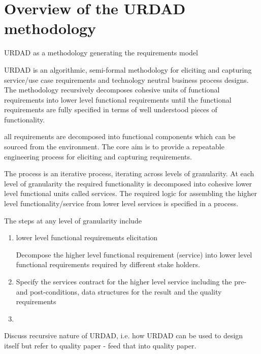 \section{Overview of the URDAD methodology \label{sec:urdadMethodology}}

URDAD as a methodology generating the requirements model

URDAD is an algorithmic, semi-formal methodology for eliciting and capturing service/use case requirements and technology neutral business process designs\cite{solms_urdad_2010}. The methodology recursively decomposes cohesive units of functional requirements into lower level functional requirements until the functional requirements are
fully specified in terms of well understood pieces of functionality.

all requirements are decomposed into functional components which can be sourced from the environment. The core aim is to provide a repeatable engineering process for eliciting and capturing requirements. 

The process is an iterative process, iterating across levels of granularity. At each level of granularity the required functionality is decomposed into cohesive lower level functional units called services. The required logic for assembling the higher level functionality/service from lower level services is specified in a process.

The steps at any level of granularity include
\begin{enumerate}
 \item lower level {functional requirements elicitation}
 
Decompose the higher level functional requirement (service) into lower level functional requirements required by different stake holders.
 \item Specify the services contract for the higher level service including the pre- and post-conditions, data structures for the result and the quality requirements
 \item 
\end{enumerate}

Discuss recursive nature of URDAD, i.e. how URDAD can be used to design itself but refer to quality paper - feed that into quality paper.

